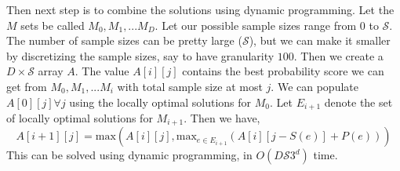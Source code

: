 \documentclass[10pt,journal,compsoc]{IEEEtran}
\newcounter{prob}
\begin{document}
{Then next step is to combine the solutions using dynamic programming. Let the $M$ sets be called $M_0, M_1, ... M_D$. Let our possible sample sizes range from $0$ to $\mathcal{S}$. The number of sample sizes can be pretty large ($\mathcal{S}$), but we can make it smaller by discretizing the sample sizes, say to have granularity $100$. Then we create a $D \times \mathcal{S}$ array $A$. The value $A\left[i\right]\left[j\right]$ contains the best probability score we can get from $M_0, M_1, ... M_i$ with total sample size at most $j$. We can populate $A\left[0\right]\left[j\right] \forall j$ using the locally optimal solutions for $M_0$. Let $E_{i+1}$ denote the set of locally optimal solutions for $M_{i+1}$. Then we have,
$$A\left[i+1\right] \left[j \right] = \textrm{max} (A\left[i\right]\left[j\right], \textrm{max}_{e \in E_{i+1}}(A\left[i\right]\left[j-S(e)\right] + P(e)))$$
This can be solved using dynamic programming, in $O(D\mathcal{S}3^d)$ time. 
}
\end{document}
